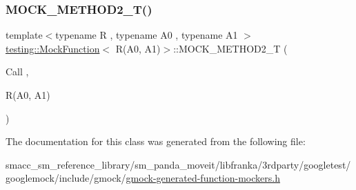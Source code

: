 \subsubsection{\texorpdfstring{M\+O\+C\+K\+\_\+\+M\+E\+T\+H\+O\+D2\+\_\+\+T()}{MOCK\_METHOD2\_T()}}
{\footnotesize\ttfamily template$<$typename R , typename A0 , typename A1 $>$ \\
\hyperlink{classtesting_1_1MockFunction}{testing\+::\+Mock\+Function}$<$ R(A0, A1)$>$\+::M\+O\+C\+K\+\_\+\+M\+E\+T\+H\+O\+D2\+\_\+T (\begin{DoxyParamCaption}\item[{Call}]{,  }\item[{R(A0, A1)}]{ }\end{DoxyParamCaption})}



The documentation for this class was generated from the following file\+:\begin{DoxyCompactItemize}
\item 
smacc\+\_\+sm\+\_\+reference\+\_\+library/sm\+\_\+panda\+\_\+moveit/libfranka/3rdparty/googletest/googlemock/include/gmock/\hyperlink{gmock-generated-function-mockers_8h}{gmock-\/generated-\/function-\/mockers.\+h}\end{DoxyCompactItemize}
